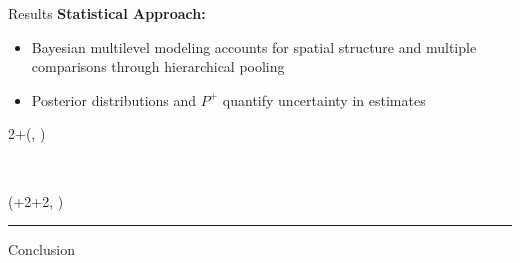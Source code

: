 \documentclass{beamer}
\newlength{\blockThree}
\newlength{\blockFour}
\begin{document}
\begin{frame}[t]
\begin{textblock*}{\colwidth}
\begin{block}{Results}
	\textbf{Statistical Approach:}
	\begin{itemize}
		\item Bayesian multilevel modeling accounts for spatial structure and multiple comparisons through hierarchical pooling
		\item Posterior distributions and $P^+$ quantify uncertainty in estimates
	\end{itemize}
\end{block}

\end{textblock*}




\begin{textblock*}{2\colwidth+\colsep}(\leftmargin, \blockFour)

\begin{block}{~}
\end{block}

\end{textblock*}




\begin{textblock*}{\colwidth}(\leftmargin+2\colwidth+2\colsep, \blockThree -460pt)
\noindent\rule{\linewidth}{0.5pt}


\begin{block}{Conclusion}
	\vspace{-0.333333\baselineskip}
	

\end{block}
\end{textblock*}
\end{frame}
\end{document}
